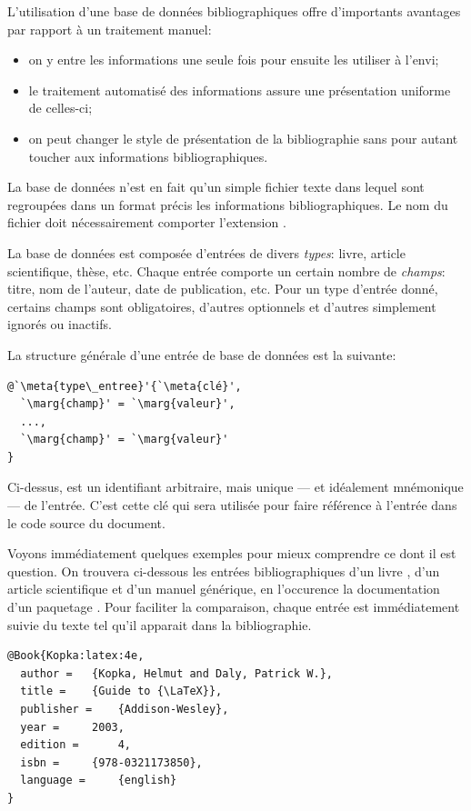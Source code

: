 L'utilisation d'une base de données bibliographiques offre
d'importants avantages par rapport à un traitement manuel:
\begin{itemize}
\item on y entre les informations une seule fois pour ensuite les
  utiliser à l'envi;
\item le traitement automatisé des informations assure une
  présentation uniforme de celles-ci;
\item on peut changer le style de présentation de la bibliographie
  sans pour autant toucher aux informations bibliographiques.
\end{itemize}

La base de données n'est en fait qu'un simple fichier texte dans
lequel sont regroupées dans un format précis les informations
bibliographiques. Le nom du fichier doit nécessairement comporter
l'extension .

La base de données est composée d'entrées de divers \emph{types}:
livre, article scientifique, thèse, etc. Chaque entrée comporte un
certain nombre de \emph{champs}: titre, nom de l'auteur, date de
publication, etc. Pour un type d'entrée donné, certains champs sont
obligatoires, d'autres optionnels et d'autres simplement ignorés ou
inactifs.

La structure générale d'une entrée de base de données est la suivante:
\begin{lstlisting}
@`\meta{type\_entree}'{`\meta{clé}',
  `\marg{champ}' = `\marg{valeur}',
  ...,
  `\marg{champ}' = `\marg{valeur}'
}
\end{lstlisting}
Ci-dessus,  est un identifiant arbitraire, mais unique ---
et idéalement mnémonique --- de l'entrée. C'est cette clé qui sera
utilisée pour faire référence à l'entrée dans le code source du
document.

Voyons immédiatement quelques exemples pour mieux comprendre ce dont
il est question. On trouvera ci-dessous les entrées bibliographiques
d'un livre \citep{Kopka:latex:4e}, d'un article scientifique
\citep{Mori:bibliographies:2009} et d'un manuel générique, en
l'occurence la documentation d'un paquetage \citep{natbib}. Pour
faciliter la comparaison, chaque entrée est immédiatement suivie du
texte tel qu'il apparait dans la bibliographie.

\begin{lstlisting}
@Book{Kopka:latex:4e,
  author = 	 {Kopka, Helmut and Daly, Patrick W.},
  title = 	 {Guide to {\LaTeX}},
  publisher = 	 {Addison-Wesley},
  year = 	 2003,
  edition = 	 4,
  isbn = 	 {978-0321173850},
  language = 	 {english}
}
\end{lstlisting}

